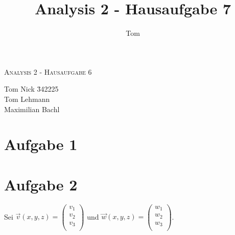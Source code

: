 \documentclass[10pt,a4paper,parskip=half]{scrartcl}
\author{Tom}
\title{Analysis 2 - Hausaufgabe 7}
\newcommand{\vecthree}[3]{\begin{pmatrix}#1\\#2\\#3\\\end {pmatrix}}
\begin{document}
\begin{center}
\textsc{\Large{Analysis 2 - Hausaufgabe 6}} \\
\end{center}
\begin{tabbing}
Tom Nick \hspace{1.4cm}\= 342225\\
Tom Lehmann\\
Maximilian Bachl
\end{tabbing}
\section*{Aufgabe 1}
\section*{Aufgabe 2}
Sei $\vec v(x,y,z) = \vecthree{v_1}{v_2}{v_3}$ und $\vec w(x,y,z) = \vecthree{w_1}{w_2}{w_3}$. 
\end{document}
